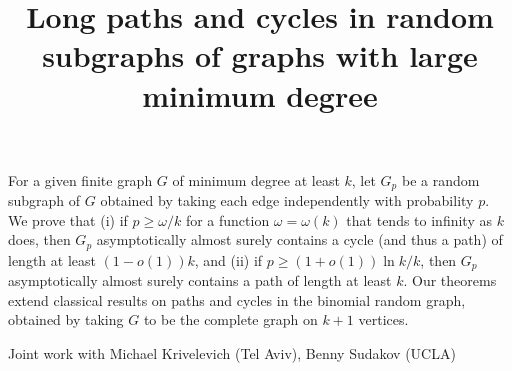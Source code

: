 \title{Long paths and cycles in random subgraphs of graphs with large minimum degree}
\endtitle
For a given finite graph $G$ of minimum degree at least $k$, let 
$G_{p}$ be a random subgraph of $G$ obtained by taking each edge 
independently with probability $p$. We prove that (i) if $p \ge 
\omega/k$ for a function $\omega=\omega(k)$ that tends to infinity 
as $k$ does, then $G_p$ asymptotically almost surely contains a 
cycle (and thus a path) of length at least $(1-o(1))k$, and (ii) if 
$p \ge (1+o(1))\ln k/k$, then $G_p$ asymptotically almost surely 
contains a path of length at least $k$. Our theorems extend 
classical results on paths and cycles in the binomial random graph, 
obtained by taking $G$ to be the complete graph on $k+1$ vertices. 

Joint work with Michael Krivelevich (Tel Aviv), Benny Sudakov (UCLA)